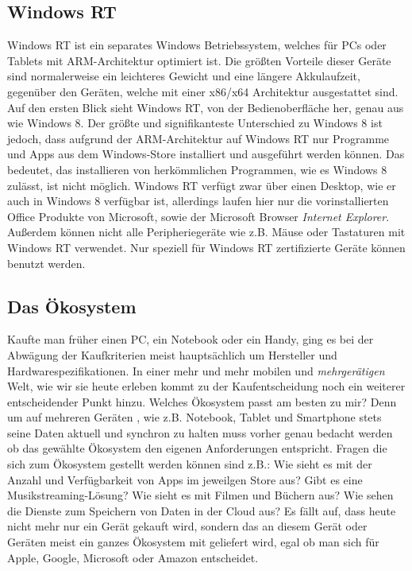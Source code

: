 \documentclass[12pt,a4paper,bibtotoc,abstracton]{scrartcl}
\begin{document}
\subsection{Windows RT}
\label{subsec:winRT}
Windows RT ist ein separates Windows Betriebssystem, welches für PCs oder Tablets mit ARM-Architektur optimiert ist. Die größten Vorteile dieser Geräte sind normalerweise ein leichteres Gewicht und eine längere Akkulaufzeit, gegenüber den Geräten, welche mit einer x86/x64 Architektur ausgestattet sind. Auf den ersten Blick sieht Windows RT, von der Bedienoberfläche her, genau aus wie Windows 8. Der größte und signifikanteste Unterschied zu Windows 8 ist jedoch, dass aufgrund der ARM-Architektur auf Windows RT nur Programme und Apps aus dem Windows-Store installiert und ausgeführt werden können. Das bedeutet, das installieren von herkömmlichen Programmen, wie es Windows 8 zulässt, ist nicht möglich. Windows RT verfügt zwar über einen Desktop, wie er auch in Windows 8 verfügbar ist, allerdings laufen hier nur die vorinstallierten Office Produkte von Microsoft, sowie der Microsoft Browser \textit{Internet Explorer}. Außerdem können nicht alle Peripheriegeräte wie z.B. Mäuse oder Tastaturen mit Windows RT verwendet. Nur speziell für Windows RT zertifizierte Geräte können benutzt werden. \citep{MicrosoftWinRT}  
 
\subsection{Das Ökosystem}
\label{subsec:ökosystem}
Kaufte man früher einen PC, ein Notebook oder ein Handy, ging es bei der Abwägung der Kaufkriterien meist hauptsächlich um Hersteller und Hardwarespezifikationen. In einer mehr und mehr mobilen und \textit{mehrgerätigen} Welt, wie wir sie heute erleben kommt zu der Kaufentscheidung noch ein weiterer entscheidender Punkt hinzu. Welches Ökosystem passt am besten zu mir? Denn um auf mehreren Geräten , wie z.B. Notebook, Tablet und Smartphone stets seine Daten aktuell und synchron zu halten muss vorher genau bedacht werden ob das gewählte Ökosystem den eigenen Anforderungen entspricht. Fragen die sich zum  Ökosystem gestellt werden können sind z.B.: Wie sieht es mit der Anzahl und Verfügbarkeit von Apps im jeweilgen Store aus? Gibt es eine Musikstreaming-Lösung? Wie sieht es mit Filmen und Büchern aus? Wie sehen die Dienste zum Speichern von Daten in der Cloud aus? Es fällt auf, dass heute nicht mehr nur ein Gerät gekauft wird, sondern das an diesem Gerät oder Geräten meist ein ganzes Ökosystem mit geliefert wird, egal ob man sich für Apple, Google, Microsoft oder Amazon entscheidet. 
\end{document}
